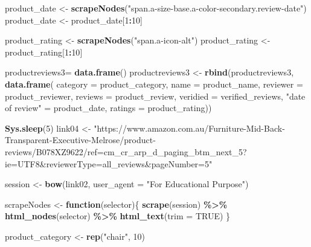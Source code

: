 \documentclass[
]{article}
\newenvironment{Shaded}{\begin{snugshade}}{\end{snugshade}}
\newcommand{\AttributeTok}[1]{\textcolor[rgb]{0.13,0.29,0.53}{#1}}
\newcommand{\ConstantTok}[1]{\textcolor[rgb]{0.56,0.35,0.01}{#1}}
\newcommand{\ControlFlowTok}[1]{\textcolor[rgb]{0.13,0.29,0.53}{\textbf{#1}}}
\newcommand{\DecValTok}[1]{\textcolor[rgb]{0.00,0.00,0.81}{#1}}
\newcommand{\FunctionTok}[1]{\textcolor[rgb]{0.13,0.29,0.53}{\textbf{#1}}}
\newcommand{\NormalTok}[1]{#1}
\newcommand{\OtherTok}[1]{\textcolor[rgb]{0.56,0.35,0.01}{#1}}
\newcommand{\SpecialCharTok}[1]{\textcolor[rgb]{0.81,0.36,0.00}{\textbf{#1}}}
\newcommand{\StringTok}[1]{\textcolor[rgb]{0.31,0.60,0.02}{#1}}
\begin{document}
\begin{Shaded}
\begin{Highlighting}[]
\NormalTok{  product\_date }\OtherTok{\textless{}{-}} \FunctionTok{scrapeNodes}\NormalTok{(}\StringTok{"span.a{-}size{-}base.a{-}color{-}secondary.review{-}date"}\NormalTok{)}
\NormalTok{  product\_date }\OtherTok{\textless{}{-}}\NormalTok{ product\_date[}\DecValTok{1}\SpecialCharTok{:}\DecValTok{10}\NormalTok{]}
  
\NormalTok{  product\_rating }\OtherTok{\textless{}{-}} \FunctionTok{scrapeNodes}\NormalTok{(}\StringTok{"span.a{-}icon{-}alt"}\NormalTok{)}
\NormalTok{  product\_rating }\OtherTok{\textless{}{-}}\NormalTok{ product\_rating[}\DecValTok{1}\SpecialCharTok{:}\DecValTok{10}\NormalTok{]}
  
\NormalTok{  productreviews3}\OtherTok{=} \FunctionTok{data.frame}\NormalTok{()}
\NormalTok{  productreviews3 }\OtherTok{\textless{}{-}} \FunctionTok{rbind}\NormalTok{(productreviews3, }\FunctionTok{data.frame}\NormalTok{(}
                      \AttributeTok{category =}\NormalTok{ product\_category,}
                      \AttributeTok{name =}\NormalTok{ product\_name,}
                      \AttributeTok{reviewer =}\NormalTok{ product\_reviewer,}
                      \AttributeTok{reviews =}\NormalTok{ product\_review,}
                      \AttributeTok{veridied =}\NormalTok{ verified\_reviews,}
                      \StringTok{"date of review"} \OtherTok{=}\NormalTok{ product\_date,}
                      \AttributeTok{ratings =}\NormalTok{ product\_rating))}
  
   \FunctionTok{Sys.sleep}\NormalTok{(}\DecValTok{5}\NormalTok{)}
\NormalTok{link04 }\OtherTok{\textless{}{-}} \StringTok{"https://www.amazon.com.au/Furniture{-}Mid{-}Back{-}Transparent{-}Executive{-}Melrose/product{-}reviews/B078XZ9622/ref=cm\_cr\_arp\_d\_paging\_btm\_next\_5?ie=UTF8\&reviewerType=all\_reviews\&pageNumber=5"}


\NormalTok{  session }\OtherTok{\textless{}{-}} \FunctionTok{bow}\NormalTok{(link02,}
               \AttributeTok{user\_agent =} \StringTok{"For Educational Purpose"}\NormalTok{)}

\NormalTok{  scrapeNodes }\OtherTok{\textless{}{-}} \ControlFlowTok{function}\NormalTok{(selector)\{}
    \FunctionTok{scrape}\NormalTok{(session) }\SpecialCharTok{\%\textgreater{}\%}
      \FunctionTok{html\_nodes}\NormalTok{(selector) }\SpecialCharTok{\%\textgreater{}\%}
      \FunctionTok{html\_text}\NormalTok{(}\AttributeTok{trim =} \ConstantTok{TRUE}\NormalTok{)}
\NormalTok{  \}}

\NormalTok{  product\_category }\OtherTok{\textless{}{-}} \FunctionTok{rep}\NormalTok{(}\StringTok{"chair"}\NormalTok{, }\DecValTok{10}\NormalTok{)}


\end{Highlighting}
\end{Shaded}
\end{document}
